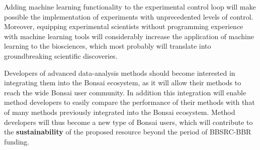 Adding machine learning functionality to the experimental control loop will
make possible the implementation of experiments with unprecedented levels of
control. Moreover, equipping experimental scientists without programming
experience with machine learning tools will considerably increase the
application of machine learning to the biosciences, which most probably will
translate into groundbreaking scientific discoveries.



Developers of advanced data-analysis methods should become interested in
integrating them into the Bonsai ecosystem, as it will allow their methods to
reach the wide Bonsai user community. In addition this integration will enable
method developers to easily compare the performance of their methods with
that of many methods previously integrated into the Bonsai ecosystem. Method
developers will thus become a new type of Bonsai users, which will contribute
to the \textbf{sustainability} of the proposed resource beyond the period of
BBSRC-BBR funding.


